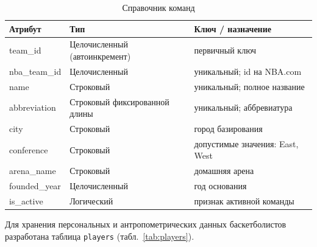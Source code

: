 {\begin{table}[H]
\caption{Справочник команд}
\label{tab:teams}
\centering
\begin{tabular}{|p{}|p{}|p{}|}
\hline
\textbf{Атрибут} & \textbf{Тип} & \textbf{Ключ / назначение} \\
\hline
team\_id & Целочисленный (автоинкремент) & первичный ключ \\
\hline
nba\_team\_id & Целочисленный & уникальный; id на NBA.com \\
\hline
name & Строковый & уникальный; полное название \\
\hline
abbreviation & Строковый фиксированной длины & уникальный; аббревиатура \\
\hline
city & Строковый & город базирования \\
\hline
conference & Строковый & допустимые значения: East, West \\
\hline
arena\_name & Строковый & домашняя арена \\
\hline
founded\_year & Целочисленный & год основания \\
\hline
is\_active & Логический & признак активной команды \\
\hline
\end{tabular}
\end{table}

{\normalsize
Для хранения персональных и антропометрических данных баскетболистов
разработана таблица \texttt{players} (табл.~\ref{tab:players}).
}

}
